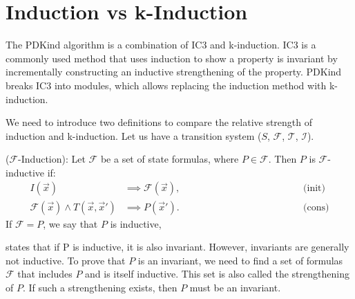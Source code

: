 \section{Induction vs k-Induction}
\noindent The PDKind algorithm is a combination of IC3 and k-induction.
IC3\cite{6148908} is a commonly used method that uses induction to show a property is invariant by incrementally constructing an inductive strengthening of the property. PDKind \cite{7886665} breaks IC3 into modules, which allows replacing the induction method with k-induction.

We need to introduce two definitions to compare the relative strength of induction and k-induction. Let us have a transition system ($S$, $\mathcal{F}$, $\mathcal{T}$, $\mathcal{I}$).
\vspace{\baselineskip}
\begin{definition}
($\mathcal{F}$-Induction\cite{7886665}): Let $\mathcal{F}$ be a set of state formulas, where $P \in \mathcal{F}$. Then \( P \) is $\mathcal{F}$-inductive if:
\begin{align*}
    I(\vec{x})
    &\implies \mathcal{F}(\vec{x}), \hspace{5cm}&\text{(init)} \\
    \mathcal{F}(\vec{x}) \land T(\vec{x}, \vec{x}') &\implies P(\vec{x}'). \hspace{5cm}&\text{(cons)}
\end{align*}
If $\mathcal{F} = {P}$, we say that \( P \) is inductive,
\label{Def:ind}
\end{definition}

\vspace{\baselineskip}
\cite{7886665} states that if P is inductive, it is also invariant. However, invariants are generally not inductive. To prove that \( P \) is an invariant, we need to find a set of formulas $\mathcal{F}$ that includes \( P \) and is itself inductive. This set is also called the strengthening of \( P \). If such a strengthening exists, then \( P \) must be an invariant.

